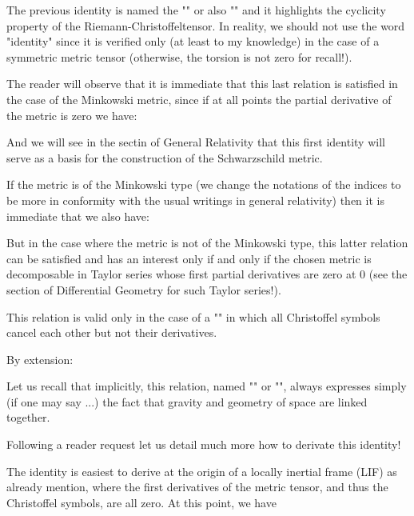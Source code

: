 	The previous identity is named the "\label{first bianchi identity}" or also "" and it highlights the cyclicity property of the  Riemann-Christoffeltensor. In reality, we should not use the word "identity" since it is verified only (at least to my knowledge) in the case of a symmetric metric tensor (otherwise, the torsion is not zero for recall!).

	The reader will observe that it is immediate that this last relation is satisfied in the case of the Minkowski metric, since if at all points the partial derivative of the metric is zero we have:
	
	And we will see in the sectin of General Relativity that this first identity will serve as a basis for the construction of the Schwarzschild metric.

	If the metric is of the Minkowski type (we change the notations of the indices to be more in conformity with the usual writings in general relativity) then it is immediate that we also have:
	
	But in the case where the metric is not of the Minkowski type, this latter relation can be satisfied and has an interest only if and only if the chosen metric is decomposable in Taylor series whose first partial derivatives are zero at $0$ (see the section of Differential Geometry for such Taylor series!).

	This relation is valid only in the case of a "" in which all Christoffel symbols cancel each other but not their derivatives.

	By extension:
	
	Let us recall that implicitly, this relation, named "\label{Bianchi second identity}" or "", always expresses simply (if one may say ...) the fact that gravity and geometry of space are linked together.

	Following a reader request let us detail much more how to derivate this identity!

	The identity is easiest to derive at the origin of a locally inertial frame (LIF) as already mention, where the first derivatives of the metric tensor, and thus the Christoffel symbols, are all zero. At this point, we have
	

